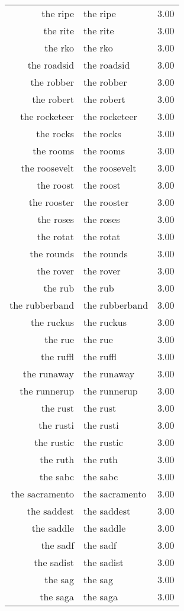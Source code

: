 \begin{table}[ht]
\begin{tabular}{rlr}
  the ripe & the ripe & 3.00 \\ 
  the rite & the rite & 3.00 \\ 
  the rko & the rko & 3.00 \\ 
  the roadsid & the roadsid & 3.00 \\ 
  the robber & the robber & 3.00 \\ 
  the robert & the robert & 3.00 \\ 
  the rocketeer & the rocketeer & 3.00 \\ 
  the rocks & the rocks & 3.00 \\ 
  the rooms & the rooms & 3.00 \\ 
  the roosevelt & the roosevelt & 3.00 \\ 
  the roost & the roost & 3.00 \\ 
  the rooster & the rooster & 3.00 \\ 
  the roses & the roses & 3.00 \\ 
  the rotat & the rotat & 3.00 \\ 
  the rounds & the rounds & 3.00 \\ 
  the rover & the rover & 3.00 \\ 
  the rub & the rub & 3.00 \\ 
  the rubberband & the rubberband & 3.00 \\ 
  the ruckus & the ruckus & 3.00 \\ 
  the rue & the rue & 3.00 \\ 
  the ruffl & the ruffl & 3.00 \\ 
  the runaway & the runaway & 3.00 \\ 
  the runnerup & the runnerup & 3.00 \\ 
  the rust & the rust & 3.00 \\ 
  the rusti & the rusti & 3.00 \\ 
  the rustic & the rustic & 3.00 \\ 
  the ruth & the ruth & 3.00 \\ 
  the sabc & the sabc & 3.00 \\ 
  the sacramento & the sacramento & 3.00 \\ 
  the saddest & the saddest & 3.00 \\ 
  the saddle & the saddle & 3.00 \\ 
  the sadf & the sadf & 3.00 \\ 
  the sadist & the sadist & 3.00 \\ 
  the sag & the sag & 3.00 \\ 
  the saga & the saga & 3.00 \\ 

\end{tabular}
\end{table}
